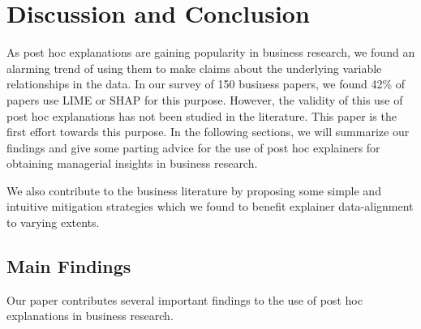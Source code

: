 \documentclass[mnsc,blindrev]{informs3}
\begin{document}
\section{Discussion and Conclusion}
    \label{sec:discussion}
    As post hoc explanations are gaining popularity in business research, we found an alarming trend of using them to make claims about the underlying variable relationships in the data. In our survey of 150 business papers, we found 42\% of papers use LIME or SHAP for this purpose. However, the validity of this use of post hoc explanations has not been studied in the literature. 
    This paper is the first effort towards this purpose. 
     In the following sections, we will summarize our findings and give some parting advice for the use of post hoc explainers for obtaining managerial insights in business research. 

    We also contribute to the business literature by proposing some simple and intuitive mitigation strategies which we found to benefit explainer data-alignment to varying extents.

    \subsection{Main Findings}
        Our paper contributes several important findings to the use of post hoc explanations in business research.
\end{document}
